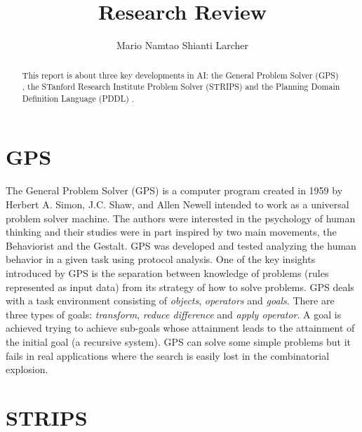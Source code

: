 \documentclass[10pt,a4paper]{article}
\begin{document}
\title{Research Review}
\author{Mario Namtao Shianti Larcher}

\maketitle

\begin{abstract}

This report is about three key developments in AI: the General Problem Solver (GPS) \cite{GPS}, the STanford Research Institute Problem Solver (STRIPS) \cite{STRIPS} and the Planning Domain Definition Language (PDDL) \cite{PDDL}.

\end{abstract}

\section{GPS}

The General Problem Solver (GPS) \cite{GPS} is a computer program created in 1959 by Herbert A. Simon, J.C. Shaw, and Allen Newell intended to work as a universal problem solver machine. The authors were interested in the psychology of human thinking and their studies were in part inspired by two main movements, the Behaviorist and the Gestalt. GPS was developed and tested analyzing  the human behavior in a given task using protocol analysis. One of the key insights introduced by GPS is the separation between knowledge of problems (rules represented as input data) from its strategy of how to solve problems. GPS deals with a task environment consisting of \textit{objects}, \textit{operators} and \textit{goals}. There are three types of goals: \textit{transform}, \textit{reduce difference} and \textit{apply operator}.	A goal is achieved trying to achieve sub-goals whose attainment leads to the attainment of the initial goal (a recursive system). GPS can solve some simple problems but it fails in real applications where the search is easily lost in the combinatorial explosion.

\section{STRIPS}
\end{document}
